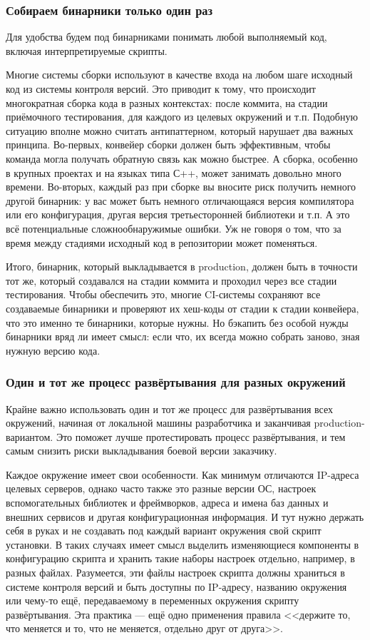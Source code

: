 \documentclass{../../text-style}
\begin{document}
\subsubsection{Собираем бинарники только один раз}

Для удобства будем под бинарниками понимать любой выполняемый код, включая интерпретируемые скрипты.

Многие системы сборки используют в качестве входа на любом шаге исходный код из системы контроля версий. Это приводит к тому, что происходит многократная сборка кода в разных контекстах: после коммита, на стадии приёмочного тестирования, для каждого из целевых окружений и т.п. Подобную ситуацию вполне можно считать антипаттерном, который нарушает два важных принципа. Во-первых, конвейер сборки должен быть эффективным, чтобы команда могла получать обратную связь как можно быстрее. А сборка, особенно в крупных проектах и на языках типа С++, может занимать довольно много времени. Во-вторых, каждый раз при сборке вы вносите риск получить немного другой бинарник: у вас может быть немного отличающаяся версия компилятора или его конфигурация, другая версия третьесторонней библиотеки и т.п. А это всё потенциальные сложнообнаружимые ошибки. Уж не говоря о том, что за время между стадиями исходный код в репозитории может поменяться.

Итого, бинарник, который выкладывается в production, должен быть в точности тот же, который создавался на стадии коммита и проходил через все стадии тестирования. Чтобы обеспечить это, многие CI-системы сохраняют все создаваемые бинарники и проверяют их хеш-коды от стадии к стадии конвейера, что это именно те бинарники, которые нужны. Но бэкапить без особой нужды бинарники вряд ли имеет смысл: если что, их всегда можно собрать заново, зная нужную версию кода.

\subsubsection{Один и тот же процесс развёртывания для разных окружений}

Крайне важно использовать один и тот же процесс для развёртывания всех окружений, начиная от локальной машины разработчика и заканчивая production-вариантом. Это поможет лучше протестировать процесс развёртывания, и тем самым снизить риски выкладывания боевой версии заказчику.

Каждое окружение имеет свои особенности. Как минимум отличаются IP-адреса целевых серверов, однако часто также это разные версии ОС, настроек вспомогательных библиотек и фреймворков, адреса и имена баз данных и внешних сервисов и другая конфигурационная информация. И тут нужно держать себя в руках и не создавать под каждый вариант окружения свой скрипт установки. В таких случаях имеет смысл выделить изменяющиеся компоненты в конфигурацию скрипта и хранить такие наборы настроек отдельно, например, в разных файлах. Разумеется, эти файлы настроек скрипта должны храниться в системе контроля версий и быть доступны по IP-адресу, названию окружения или чему-то ещё, передаваемому в переменных окружения скрипту развёртывания. Эта практика --- ещё одно применения правила <<держите то, что меняется и то, что не меняется, отдельно друг от друга>>.
\end{document}
